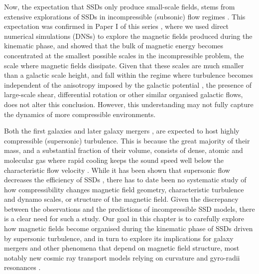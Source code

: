 Now, the expectation that SSDs only produce small-scale fields, stems from extensive explorations of SSDs in incompressible (\eg subsonic) flow regimes \citep[see seminal works by, \eg][]{kazantsev1968, vainshtein1982theory, vincenzi2002kraichnan, schekochihin2004simulations, boldyrev2004magnetic}. This expectation was confirmed in Paper I of this series \citep[][herein ]{kriel2022fundamental}, where we used direct numerical simulations (DNSs) to explore the magnetic fields produced during the kinematic phase, and showed that the bulk of magnetic energy becomes concentrated at the smallest possible scales in the incompressible problem, \ie the scale where magnetic fields dissipate. Given that these scales are much smaller than a galactic scale height, and fall within the regime where turbulence becomes independent of the anisotropy imposed by the galactic potential \citep{Kortgen2021_power_spectrum_of_isolated_galaxies}, the presence of large-scale shear, differential rotation or other similar organised galactic flows, does not alter this conclusion. However, this understanding may not fully capture the dynamics of more compressible environments.

Both the first galaxies \citep{maio2011impact, mandelker2020instability} and later galaxy mergers \citep{geng2012magnetic, sparre2022gas}, are expected to host highly compressible (\ie supersonic) turbulence. This is because the great majority of their mass, and a substantial fraction of their volume, consists of dense, atomic and molecular gas \citep{cox2006kinematic, krumholz2009star, popping2014evolution, nandakumar2023large} where rapid cooling keeps the sound speed well below the characteristic flow velocity \citep{rees1977cooling, white1978core, birnboim2003virial, Krumholz2020_cr_transport_starburst, li2020impact}. While it has been shown that supersonic flow decreases the efficiency of SSDs \citep{federrath2011mach, federrath2014turbulent, seta2021saturation, seta2022turbulent, hew2023lagrangian}, there has to date been no systematic study of how compressibility changes magnetic field geometry, characteristic turbulence and dynamo scales, or structure of the magnetic field. Given the discrepancy between the observations and the predictions of incompressible SSD models, there is a clear need for such a study. Our goal in this chapter is to carefully explore how magnetic fields become organised during the kinematic phase of SSDs driven by supersonic turbulence, and in turn to explore its implications for galaxy mergers and other phenomena that depend on magnetic field structure, most notably new cosmic ray transport models relying on curvature and gyro-radii resonances \citep[\eg][]{kempski2023cosmic, Lemoine2023_field_reversal_CR_transport}.

